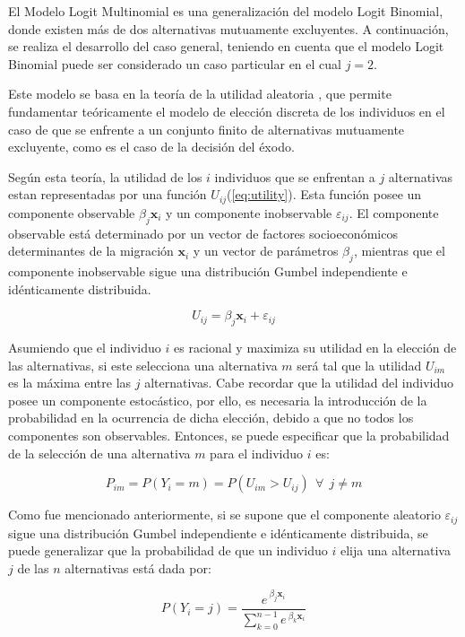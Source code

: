 \documentclass[12pt,a4paper]{article}
\begin{document}
El Modelo Logit Multinomial es una generalización del modelo Logit Binomial, donde existen más de dos alternativas mutuamente excluyentes. A continuación, se realiza el desarrollo del caso general, teniendo en cuenta que el modelo Logit Binomial puede ser considerado un caso particular en el cual $j=2$.

Este modelo se basa en la teoría de la utilidad aleatoria \parencite{domencich_urban_1975}, que permite fundamentar teóricamente el modelo de elección discreta de los individuos en el caso de que se enfrente a un conjunto finito de alternativas mutuamente excluyente, como es el caso de la decisión del éxodo.

Según esta teoría, la utilidad de los $i$ individuos que se enfrentan a $j$ alternativas estan representadas por una función $U_{ij}$(\ref{eq:utility}). Esta función posee un componente observable $\beta_{j} \textbf{x}_{i}$ y un componente inobservable $\varepsilon_{ij}$. El componente observable está determinado por un vector de factores socioeconómicos determinantes de la migración $\textbf{x}_{i}$ y un vector de parámetros $\beta_{j}$, mientras que el componente inobservable sigue una distribución  Gumbel independiente e idénticamente distribuida.
\begin {center}
\begin{equation}\label{eq:utility}
U_{ij}=\beta_{j} \textbf{x}_{i}+\varepsilon_{ij}
\end{equation}
\end {center}

Asumiendo que el individuo $i$ es racional y maximiza su utilidad en la elección de las  alternativas, si este selecciona una alternativa $m$ será tal que la utilidad $U_{im}$ es la máxima entre las $j$ alternativas. Cabe recordar que la utilidad del individuo posee un componente estocástico, por ello, es necesaria la introducción de la probabilidad en la ocurrencia de dicha elección, debido a que no todos los componentes son observables. Entonces, se puede especificar que  la probabilidad de la selección de una alternativa $m$ para el individuo $i$ es:
\begin {center}
\begin{equation}\label{eq:prob}
P_{im}=P{(Y_{i}=m)} =P(U_{im}>U_{ij}) \ \ \forall \ \ j\neq m
\end{equation}
\end {center}

Como fue mencionado anteriormente, si se supone que el componente aleatorio $\varepsilon_{ij}$ sigue una distribución Gumbel independiente e idénticamente distribuida, se puede generalizar que la probabilidad de que un individuo $i$ elija una alternativa $j$ de las $n$ alternativas está dada por:
\begin {center}
\begin{equation}\label{eq:multinom}
P{(Y_{i}=j)}=\frac{e^{\ \beta_{j} \textbf{x}_{i}}}{\sum_{k=0}^{n-1}e^{\ \beta_{k} \textbf{x}_{i}}}
\end{equation}
\end {center}
\end{document}
